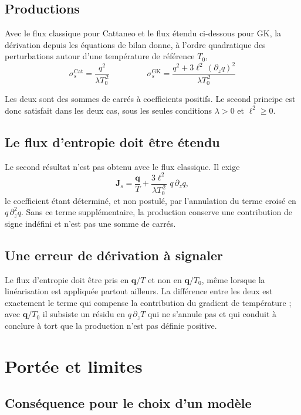 \documentclass[11pt,a4paper]{article}
\begin{document}
\subsection{Productions}

Avec le flux classique pour Cattaneo et le flux étendu ci-dessous pour GK,
la dérivation depuis les équations de bilan
donne, à l'ordre quadratique des perturbations autour d'une température de référence $T_0$,
\[ \boxed{\;\sigma_s^{\text{Cat}} = \frac{q^2}{\lambda T_0^{\,2}}\;}
\qquad\qquad
\boxed{\;\sigma_s^{\text{GK}} = \frac{q^2 + 3\ell^2\,(\partial_z q)^2}{\lambda T_0^{\,2}}\;} \]

Les deux sont des sommes de carrés à coefficients positifs. Le second principe est donc satisfait
dans les deux cas, sous les seules conditions $\lambda > 0$ et $\ell^2 \ge 0$.

\subsection{Le flux d'entropie doit être étendu}

Le second résultat n'est pas obtenu avec le flux classique. Il exige
\[ \mathbf{J}_s = \frac{\mathbf{q}}{T} + \frac{3\ell^2}{\lambda T_0^{\,2}}\;q\,\partial_z q , \]
le coefficient étant déterminé, et non postulé, par l'annulation du terme croisé en
$q\,\partial_z^2 q$. Sans ce terme supplémentaire, la production conserve une contribution de signe
indéfini et n'est pas une somme de carrés.

\subsection{Une erreur de dérivation à signaler}

Le flux d'entropie doit être pris en $\mathbf{q}/T$ et non en $\mathbf{q}/T_0$, même lorsque la
linéarisation est appliquée partout ailleurs. La différence entre les deux est exactement le terme
qui compense la contribution du gradient de température ; avec $\mathbf{q}/T_0$ il subsiste un
résidu en $q\,\partial_z T$ qui ne s'annule pas et qui conduit à conclure à tort que la production
n'est pas définie positive.

\section{Portée et limites}

\subsection{Conséquence pour le choix d'un modèle}
\end{document}
